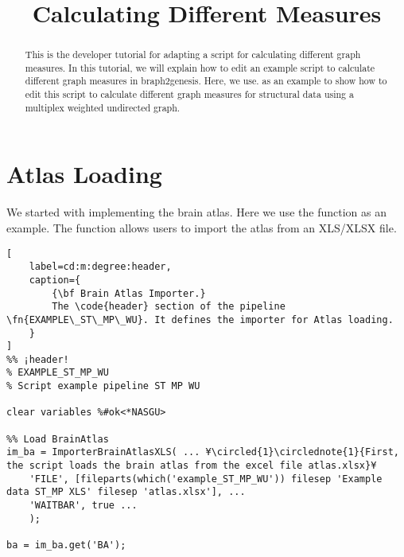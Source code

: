 \documentclass{tufte-handout}
\title{Calculating Different Measures}
\begin{document}
\maketitle

\begin{abstract}
\noindent
This is the developer tutorial for adapting a script for calculating different graph measures. In this tutorial, we will explain how to edit an example script to calculate different graph measures in braph2genesis. Here, we use.  as an example to show how to edit this script to calculate different graph measures for structural data using a multiplex weighted undirected graph.
\end{abstract}

\tableofcontents

\clearpage
\section{Atlas Loading}
We started with implementing the brain atlas. Here we use the function  as an example. The function allows users to import the atlas from an XLS/XLSX file. 
\begin{lstlisting}[
	label=cd:m:degree:header,
	caption={
		{\bf Brain Atlas Importer.}
		The \code{header} section of the pipeline \fn{EXAMPLE\_ST\_MP\_WU}. It defines the importer for Atlas loading.
	}
]
%% ¡header!
% EXAMPLE_ST_MP_WU
% Script example pipeline ST MP WU

clear variables %#ok<*NASGU>

%% Load BrainAtlas
im_ba = ImporterBrainAtlasXLS( ... ¥\circled{1}\circlednote{1}{First, the script loads the brain atlas from the excel file atlas.xlsx}¥
    'FILE', [fileparts(which('example_ST_MP_WU')) filesep 'Example data ST_MP XLS' filesep 'atlas.xlsx'], ...
    'WAITBAR', true ...
    );

ba = im_ba.get('BA');
\end{lstlisting}





\end{document}
